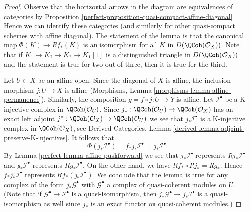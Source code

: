 \begin{proof}

Observe that the horizontal arrows in the diagram are
equivalences of categories by
Proposition \ref{perfect-proposition-quasi-compact-affine-diagonal}.
Hence we can identify these categories (and similarly for
other quasi-compact schemes with affine diagonal).
The statement of the lemma is that the canonical map
$\Phi(K) \to Rf_*(K)$ is an isomorphism for all $K$ in
$D(\QCoh(\mathcal{O}_X))$. Note that if $K_1 \to K_2 \to K_3 \to K_1[1]$
is a distinguished triangle in $D(\QCoh(\mathcal{O}_X))$ and
the statement is true for two-out-of-three, then it is true
for the third.

\medskip\noindent
Let $U \subset X$ be an affine open. Since the diagonal of $X$ is affine,
the inclusion morphism $j : U \to X$
is affine (Morphisms, Lemma \ref{morphisms-lemma-affine-permanence}).
Similarly, the composition $g = f \circ j : U \to Y$ is affine.
Let $\mathcal{I}^\bullet$ be a K-injective complex in $\QCoh(\mathcal{O}_U)$.
Since $j_* : \QCoh(\mathcal{O}_U) \to \QCoh(\mathcal{O}_X)$
has an exact left adjoint
$j^* : \QCoh(\mathcal{O}_X) \to \QCoh(\mathcal{O}_U)$
we see that $j_*\mathcal{I}^\bullet$ is a K-injective complex
in $\QCoh(\mathcal{O}_X)$, see
Derived Categories, Lemma \ref{derived-lemma-adjoint-preserve-K-injectives}.
It follows that
$$
\Phi(j_*\mathcal{I}^\bullet) =
f_*j_*\mathcal{I}^\bullet =
g_*\mathcal{I}^\bullet
$$
By Lemma \ref{perfect-lemma-affine-pushforward} we see that
$j_*\mathcal{I}^\bullet$ represents $Rj_*\mathcal{I}^\bullet$ and
$g_*\mathcal{I}^\bullet$ represents $Rg_*\mathcal{I}^\bullet$.
On the other hand, we have $Rf_* \circ Rj_* = Rg_*$.
Hence $f_*j_*\mathcal{I}^\bullet$ represents $Rf_*(j_*\mathcal{I}^\bullet)$.
We conclude that the lemma is true for any complex
of the form $j_*\mathcal{G}^\bullet$ with $\mathcal{G}^\bullet$
a complex of quasi-coherent modules on $U$. (Note that if
$\mathcal{G}^\bullet \to \mathcal{I}^\bullet$ is a quasi-isomorphism,
then $j_*\mathcal{G}^\bullet \to j_*\mathcal{I}^\bullet$ is a
quasi-isomorphism as well since $j_*$ is an exact functor
on quasi-coherent modules.)


\end{proof}
